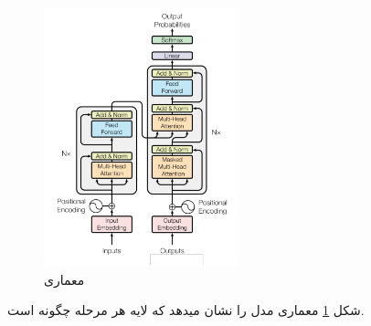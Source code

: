 \begin{figure}[H]
	\centering
	\includegraphics[width=0.5\textwidth]{figures/Transformer.png}
	\caption{معماری }
	\label{fig:Transformer}
\end{figure}
شکل \ref{fig:Transformer} معماری مدل  را نشان میدهد که لایه هر مرحله چگونه است.

